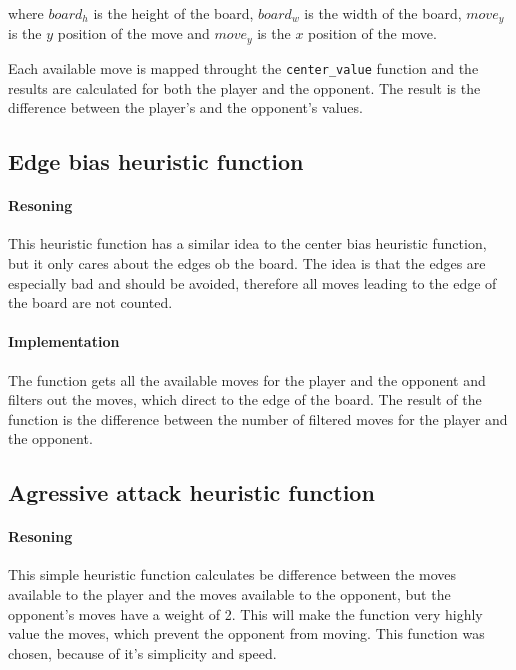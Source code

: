 \documentclass[11pt]{article}
\begin{document}
where $board_h$ is the height of the board, $board_w$ is the width of the board, $move_y$ is the $y$ position of the move and $move_y$ is the $x$ position of the move.

Each available move is mapped throught the \texttt{center{\_}value} function and the results are calculated for both the player and the opponent. The result is the difference between the player's and the opponent's values.

\subsection{Edge bias heuristic function}

\paragraph{Resoning}

This heuristic function has a similar idea to the center bias heuristic function, but it only cares about the edges ob the board. The idea is that the edges are especially bad and should be avoided, therefore all moves leading to the edge of the board are not counted.

\paragraph{Implementation}

The function gets all the available moves for the player and the opponent and filters out the moves, which direct to the edge of the board. The result of the function is the difference between the number of filtered moves for the player and the opponent.

\subsection{Agressive attack heuristic function}

\paragraph{Resoning}

This simple heuristic function calculates be difference between the moves available to the player and the moves available to the opponent, but the opponent's moves have a weight of 2. This will make the function very highly value the moves, which prevent the opponent from moving. This function was chosen, because of it's simplicity and speed.
\end{document}
